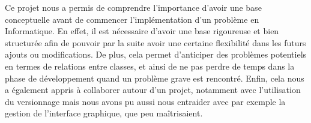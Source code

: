 \documentclass[paper=a4,fontsize=12pt,titlepage]{scrartcl}
\begin{document}
    Ce projet nous a permis de comprendre l'importance d'avoir une base conceptuelle avant de commencer
    l'implémentation d'un problème en Informatique. En effet, il est nécessaire d'avoir une base rigoureuse et bien structurée
    afin de pouvoir par la suite avoir une certaine flexibilité dans les futurs ajouts ou modifications. De plus,
    cela permet d'anticiper des problèmes potentiels en termes de relations entre classes, et ainsi de ne pas perdre de
    temps dans la phase de développement quand un problème grave est rencontré. Enfin, cela nous a également appris à
    collaborer autour d'un projet, notamment avec l'utilisation du versionnage mais nous avons pu aussi nous entraider avec
    par exemple la gestion de l'interface graphique, que peu maîtrisaient.
\end{document}
